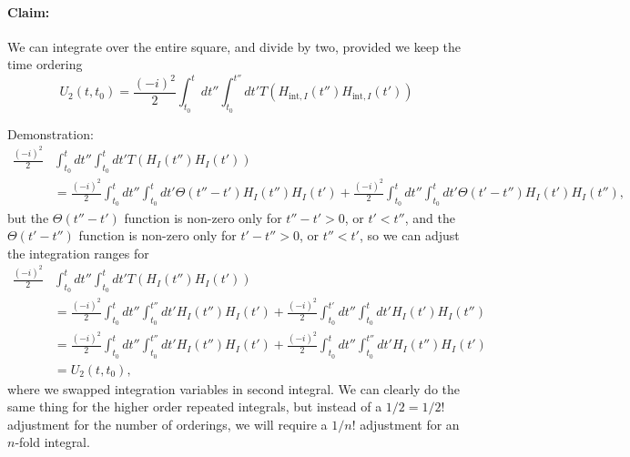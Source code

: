 \paragraph{Claim:} We can integrate over the entire square, and divide by two, provided we keep the time ordering
\begin{dmath}\label{eqn:qftLecture13:1040}
U_2(t, t_0)
= \frac{(-i )^2}{2}
\int_{t_0}^t dt''
\int_{t_0}^{t''}
dt'
T(H_{\text{int}, I}(t'') H_{\text{int}, I}(t') )
\end{dmath}

Demonstration:
\begin{dmath}\label{eqn:qftLecture13:1100}
\begin{aligned}
\frac{(-i)^2}{2}
&\int_{t_0}^t dt''
\int_{t_0}^t dt'
T( H_I(t'') H_I(t') ) \\
&=
\frac{(-i)^2}{2}
\int_{t_0}^t dt''
\int_{t_0}^t dt'
\Theta(t''- t')
H_I(t'') H_I(t')
+
\frac{(-i)^2}{2}
\int_{t_0}^t dt''
\int_{t_0}^t dt'
\Theta(t'- t'')
H_I(t') H_I(t''),
\end{aligned}
\end{dmath}
but the \( \Theta(t'' - t') \) function is non-zero only for \( t'' - t' > 0 \), or \( t' < t'' \), and the
\( \Theta(t' - t'') \) function is non-zero only for \( t' - t'' > 0 \), or \( t'' < t' \), so we can adjust the integration ranges for
\begin{dmath}\label{eqn:qftLecture13:1260}
\begin{aligned}
\frac{(-i)^2}{2}
&\int_{t_0}^t dt''
\int_{t_0}^t dt'
T( H_I(t'') H_I(t') ) \\
&=
\frac{(-i)^2}{2}
\int_{t_0}^t dt''
\int_{t_0}^{t''} dt'
H_I(t'') H_I(t')
+
\frac{(-i)^2}{2}
\int_{t_0}^{t'} dt''
\int_{t_0}^t dt'
H_I(t') H_I(t'') \\
&=
\frac{(-i)^2}{2}
\int_{t_0}^t dt''
\int_{t_0}^{t''} dt'
H_I(t'') H_I(t')
+
\frac{(-i)^2}{2}
\int_{t_0}^t dt''
\int_{t_0}^{t''} dt'
H_I(t'') H_I(t') \\
&=
U_2(t, t_0),
\end{aligned}
\end{dmath}
where we swapped integration variables in second integral.  We can clearly do the same thing for the higher order repeated integrals, but instead of a \(1/2 = 1/2!\) adjustment for the number of orderings, we will require a \( 1/n! \) adjustment for an \( n \)-fold integral.

